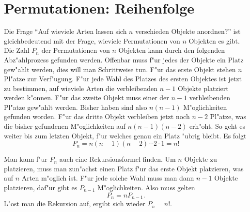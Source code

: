 \section{Permutationen: Reihenfolge} \label{kombinatorik-permutation}
Die Frage ``Auf wieviele Arten lassen sich $n$ verschieden Objekte anordnen?''
ist gleichbedeutend mit der Frage, wieviele Permutationen von $n$
Objekten es gibt.
Die Zahl  $P_n$ der Permutationen von $n$ Objekten
kann durch den folgenden Abz"ahlprozess gefunden werden.
Offenbar muss f"ur jedes der Objekte ein Platz gew"ahlt werden, dies will
man Schrittweise tun.
F"ur das erste Objekt stehen $n$ Pl"atze
zur Verf"ugung.
F"ur jede Wahl des Platzes des ersten Objektes 
ist jetzt zu bestimmen, auf wieviele Arten die verbleibenden
$n-1$ Objekte platziert werden k"onnen.
F"ur das zweite
Objekt muss einer der $n-1$ verbleibenden Pl"atze gew"ahlt werden.
Bisher haben sind also $n(n-1)$ M"oglichkeiten gefunden worden.
F"ur das dritte Objekt verbleiben jetzt noch $n-2$ Pl"atze,
was die bisher gefundenen M"oglichkeiten auf $n(n-1)(n-2)$
erh"oht.
So geht es weiter bis zum letzten Objekt, f"ur welches
genau ein Platz "ubrig bleibt.
Es folgt
\[
P_n=n(n-1)(n-2)\dotsm 2\cdot 1=n!
\]

Man kann f"ur $P_n$ auch eine Rekursionsformel finden.
Um $n$ Objekte
zu platzieren, muss man zun"achst einen Platz f"ur das erste Objekt
platzieren, was auf $n$ Arten m"oglich ist.
F"ur jede solche Wahl
muss man dann $n-1$ Objekte platzieren, daf"ur gibt es $P_{n-1}$
M"oglichkeiten.
Also muss gelten
\[
P_n=nP_{n-1}.
\]
L"ost man die Rekursion auf, ergibt sich wieder $P_n=n!$.


